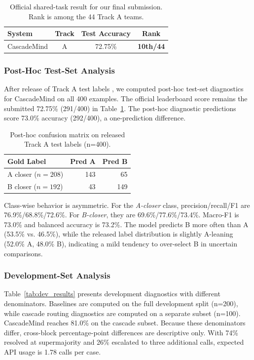 \documentclass[11pt]{article}
\begin{document}
\begin{table}[t]
\centering
\small
\begin{tabular}{lccc}
\toprule
\textbf{System} & \textbf{Track} & \textbf{Test Accuracy} & \textbf{Rank} \\
\midrule
CascadeMind & A & 72.75\% & \textbf{10th/44} \\
\bottomrule
\end{tabular}
\caption{Official shared-task result for our final submission. Rank is among the 44 Track A teams.}
\label{tab:official_results}
\end{table}

\subsubsection{Post-Hoc Test-Set Analysis}
After release of Track A test labels \citep{narrative-similarity-dataset-2026}, we computed post-hoc test-set diagnostics for CascadeMind on all 400 examples. The official leaderboard score remains the submitted 72.75\% (291/400) in Table~\ref{tab:official_results}. The post-hoc diagnostic predictions score 73.0\% accuracy (292/400), a one-prediction difference.

\begin{table}[t]
\centering
\small
\begin{tabular}{lrr}
\toprule
\textbf{Gold Label} & \textbf{Pred A} & \textbf{Pred B} \\
\midrule
A closer ($n{=}208$) & 143 & 65 \\
B closer ($n{=}192$) & 43 & 149 \\
\bottomrule
\end{tabular}
\caption{Post-hoc confusion matrix on released Track A test labels (n=400).}
\label{tab:test_confusion}
\end{table}

Class-wise behavior is asymmetric. For the \emph{A-closer} class, precision/recall/F1 are 76.9\%/68.8\%/72.6\%. For \emph{B-closer}, they are 69.6\%/77.6\%/73.4\%. Macro-F1 is 73.0\% and balanced accuracy is 73.2\%. The model predicts B more often than A (53.5\% vs. 46.5\%), while the released label distribution is slightly A-leaning (52.0\% A, 48.0\% B), indicating a mild tendency to over-select B in uncertain comparisons.

\subsubsection{Development-Set Analysis}
Table~\ref{tab:dev_results} presents development diagnostics with different denominators. Baselines are computed on the full development split (n=200), while cascade routing diagnostics are computed on a separate subset (n=100). CascadeMind reaches 81.0\% on the cascade subset. Because these denominators differ, cross-block percentage-point differences are descriptive only. With 74\% resolved at supermajority and 26\% escalated to three additional calls, expected API usage is 1.78 calls per case.
\end{document}
